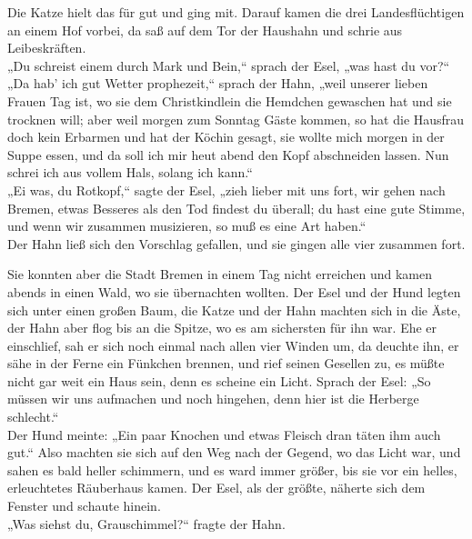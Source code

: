\documentclass[12pt,a4paper]{article}
\begin{document}
Die Katze hielt das für gut und ging mit. Darauf kamen die drei Landesflüchtigen an einem Hof vorbei, da saß auf dem Tor der Haushahn und schrie aus Leibeskräften.\\

„Du schreist einem durch Mark und Bein,“ sprach der Esel, „was hast du vor?“\\

„Da hab' ich gut Wetter prophezeit,“ sprach der Hahn, „weil unserer lieben Frauen Tag ist, wo sie dem Christkindlein die Hemdchen gewaschen hat und sie trocknen will; aber weil morgen zum Sonntag Gäste kommen, so hat die Hausfrau doch kein Erbarmen und hat der Köchin gesagt, sie wollte mich morgen in der Suppe essen, und da soll ich mir heut abend den Kopf abschneiden lassen. Nun schrei ich aus vollem Hals, solang ich kann.“\\

„Ei was, du Rotkopf,“ sagte der Esel, „zieh lieber mit uns fort, wir gehen nach Bremen, etwas Besseres als den Tod findest du überall; du hast eine gute Stimme, und wenn wir zusammen musizieren, so muß es eine Art haben.“\\

Der Hahn ließ sich den Vorschlag gefallen, und sie gingen alle vier zusammen fort.\par

Sie konnten aber die Stadt Bremen in einem Tag nicht erreichen und kamen abends in einen Wald, wo sie übernachten wollten. Der Esel und der Hund legten sich unter einen großen Baum, die Katze und der Hahn machten sich in die Äste, der Hahn aber flog bis an die Spitze, wo es am sichersten für ihn war. Ehe er einschlief, sah er sich noch einmal nach allen vier Winden um, da deuchte ihn, er sähe in der Ferne ein Fünkchen brennen, und rief seinen Gesellen zu, es müßte nicht gar weit ein Haus sein, denn es scheine ein Licht. Sprach der Esel: „So müssen wir uns aufmachen und noch hingehen, denn hier ist die Herberge schlecht.“\\
Der Hund meinte: „Ein paar Knochen und etwas Fleisch dran täten ihm auch gut.“ Also machten sie sich auf den Weg nach der Gegend, wo das Licht war, und sahen es bald heller schimmern, und es ward immer größer, bis sie vor ein helles, erleuchtetes Räuberhaus kamen. Der Esel, als der größte, näherte sich dem Fenster und schaute hinein.\\

„Was siehst du, Grauschimmel?“ fragte der Hahn.\\
\end{document}

